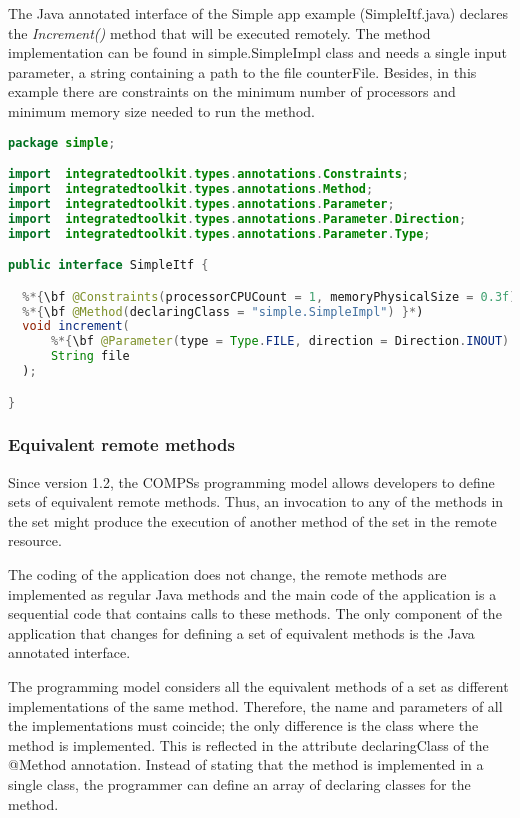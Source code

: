     
The Java annotated interface of the Simple app example (SimpleItf.java) declares the {\it Increment()} method
that will be executed remotely. The method implementation can be found in simple.SimpleImpl class and
needs a single input parameter, a string containing a path to the file counterFile. Besides, in this example
there are constraints on the minimum number of processors and minimum memory size needed to run the
method.

\begin{lstlisting}[language=java]
package simple;

import  integratedtoolkit.types.annotations.Constraints;
import  integratedtoolkit.types.annotations.Method;
import  integratedtoolkit.types.annotations.Parameter;
import  integratedtoolkit.types.annotations.Parameter.Direction;
import  integratedtoolkit.types.annotations.Parameter.Type;

public interface SimpleItf {

  %*{\bf @Constraints(processorCPUCount = 1, memoryPhysicalSize = 0.3f) }*)
  %*{\bf @Method(declaringClass = "simple.SimpleImpl") }*)
  void increment(
      %*{\bf @Parameter(type = Type.FILE, direction = Direction.INOUT) }*)
      String file
  );

}
\end{lstlisting}


\subsubsection{Equivalent remote methods}
Since version 1.2, the COMPSs programming model allows developers to define sets of equivalent remote
methods. Thus, an invocation to any of the methods in the set might produce the execution of another
method of the set in the remote resource.

The coding of the application does not change, the remote methods are implemented as regular Java
methods and the main code of the application is a sequential code that contains calls to these methods. The
only component of the application that changes for defining a set of equivalent methods is the Java
annotated interface.

The programming model considers all the equivalent methods of a set as different implementations of the
same method. Therefore, the name and parameters of all the implementations must coincide; the only
difference is the class where the method is implemented. This is reflected in the attribute declaringClass of
the @Method annotation. Instead of stating that the method is implemented in a single class, the
programmer can define an array of declaring classes for the method.

